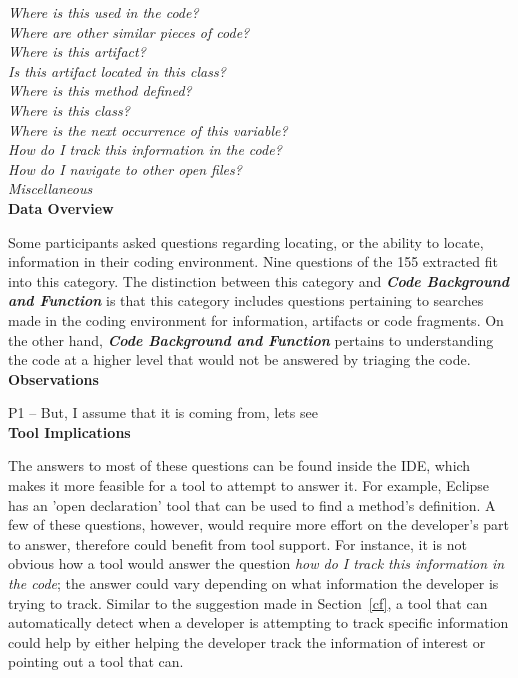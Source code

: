 \documentclass[conference]{IEEEtran}
\begin{document}
\noindent\emph{Where is this used in the code?} \\
\emph{Where are other similar pieces of code?} \\
\emph{Where is this artifact?} \\
\emph{Is this artifact located in this class?} \\
\emph{Where is this method defined?} \\
\emph{Where is this class? } \\
\emph{Where is the next occurrence of this variable?} \\
\emph{How do I track this information in the code?} \\
\emph{How do I navigate to other open files?} \\
\emph{Miscellaneous} \\

\noindent\textbf{Data Overview}

Some participants asked questions regarding locating, or the ability to locate, information in their coding environment. 
Nine questions of the 155 extracted fit into this category.
The distinction between this category and \emph{\textbf{Code Background and Function}} is that this category includes questions pertaining to searches made in the coding environment for information, artifacts or code fragments. 
On the other hand, \emph{\textbf{Code Background and Function}} pertains to understanding the code at a higher level that would not be answered by triaging the code.
\\

\noindent\textbf{Observations}

P1 -- But, I assume that it is coming from, lets see
\\

\noindent\textbf{Tool Implications}

The answers to most of these questions can be found inside the IDE, which makes it more feasible for a tool to attempt to answer it. For example, Eclipse has an 'open declaration' tool that can be used to find a method's definition. A few of these questions, however, would require more effort on the developer's part to answer, therefore could benefit from tool support. For instance, it is not obvious how a tool would answer the question \emph{how do I track this information in the code}; the answer could vary depending on what information the developer is trying to track.
Similar to the suggestion made in Section~\ref{cf}, a tool that can automatically detect when a developer is attempting to track specific information could help by either helping the developer track the information of interest or pointing out a tool that can.
\end{document}
